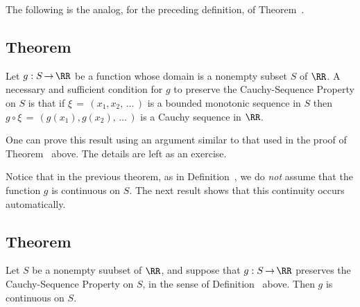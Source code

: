 \V

        The following is the analog, for the preceding definition, of Theorem~.

\V

            \subsection{\small{\bf Theorem}}
            \label{ThmF20.80}

        Let $g:S \,{\rightarrow}\, {\RR}$ be a function whose domain is a nonempty subset $S$ of ${\RR}$.
    A necessary and sufficient condition for $g$ to preserve the Cauchy-Sequence Property on $S$ is that if ${\xi} \,=\, (x_{1},x_{2},\,{\ldots}\,)$ is a bounded monotonic sequence in $S$ then $g{\circ}{\xi} \,=\, (g(x_{1}),g(x_{2}),\,{\ldots}\,)$ is a Cauchy sequence in ${\RR}$.

\V

        One can prove this result using an argument similar to that used in the proof of Theorem~ above.
    The details are left as an exercise.

\V
\V

        Notice that in the previous theorem, as in Definition~, we do {\em not} assume that the function $g$ is continuous on $S$.
    The next result shows that this continuity occurs automatically.

\V

            \subsection{\small{\bf Theorem}}
            \label{ThmF20.85}

        Let $S$ be a nonempty suubset of ${\RR}$, and suppose that $g:S \,{\rightarrow}\, {\RR}$ preserves the Cauchy-Sequence Property on $S$,
    in the sense of Definition~ above. Then $g$ is continuous on $S$.

\V


